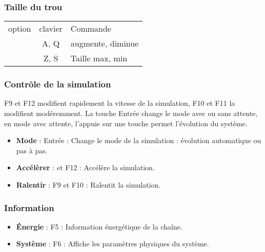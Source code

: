 \subsubsection{Taille du trou}
%
\begin{center}
\begin{tabular}{ccl}
option & clavier & Commande \\
& {\sf A},  {\sf Q} & augmente, diminue\\
& {\sf Z},  {\sf S} & Taille max, min\\
\end{tabular}
\end{center}
%
%
\subsubsection{Contrôle de la simulation}
%
{\sf F9} et {\sf F12} modifient rapidement la vitesse de la simulation, {\sf F10} et {\sf F11} la modifient modéremment. La touche {\sf Entrée} change le mode avec ou sans attente, en mode avec attente, l'appuie sur une touche permet l'évolution du système.
%
\begin{itemize}[label=, leftmargin=2cm, itemsep=0pt]
\item {\bf Mode} : {\sf Entrée} : Change le mode de la simulation : évolution automatique ou pas à pas.
\item {\bf Accélèrer} : {} et {\sf F12} : Accélère la simulation.
\item {\bf Ralentir} : {\sf F9} et {\sf F10} : Ralentit la simulation.
\end{itemize}
%
%
\subsubsection{Information}
\begin{itemize}[label=, leftmargin=2cm, itemsep=0pt]
\item {\bf Énergie} : {\sf F5} : Information énergétique de la chaîne.
\item {\bf Système} : {\sf F6} : Affiche les paramètres physiques du système.
\end{itemize}
%
